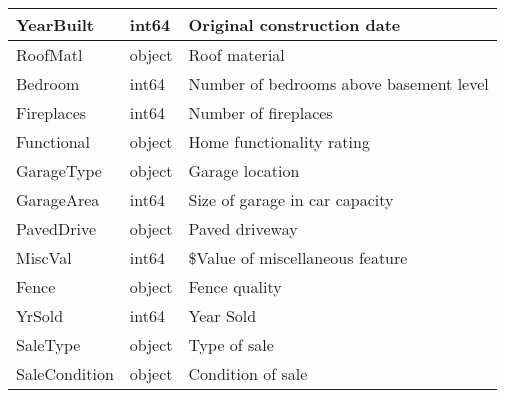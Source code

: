 \begin{longtable}{|p{3cm}|p{3cm}|p{6.6cm}|}
YearBuilt   & int64     & Original construction date \\ \hline
RoofMatl    & object    & Roof material \\ \hline
Bedroom     & int64     & Number of bedrooms above basement level \\ \hline
Fireplaces  & int64     & Number of fireplaces \\ \hline
Functional  & object    & Home functionality rating \\ \hline
GarageType  & object    & Garage location \\ \hline
GarageArea  & int64     & Size of garage in car capacity \\ \hline
PavedDrive  & object    & Paved driveway \\ \hline
MiscVal     & int64     & \$Value of miscellaneous feature \\ \hline
Fence       & object    & Fence quality \\ \hline
YrSold      & int64     & Year Sold \\ \hline
SaleType    & object    & Type of sale \\ \hline
SaleCondition & object  & Condition of sale \\ \hline
\end{longtable}






